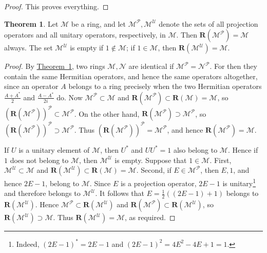 \documentclass[
  paper=b5,
  twoside=true,
  fontsize=13pt,
  headings=normal,
  bookmarkpackage=false
]{scrartcl}
\theoremstyle{definition}
\newtheorem{theorem}{Theorem}
\newcommand{\TheoremRef}[1]{\hyperref[thm:#1]{Theorem~#1}}
\newcommand{\GeneratedRing}{\boldsymbol{R}}
\begin{document}
\begin{proof}
This proves everything.
\end{proof}

\begin{theorem}\label{thm:2}
Let \(\mathcal M\) be a ring, and let
\(\mathcal M^{\mathcal P},\mathcal M^{\mathcal U}\) denote the sets of all
projection operators and all unitary operators, respectively, in
\(\mathcal M\). Then \(\GeneratedRing (\mathcal M^{\mathcal P})=\mathcal M\) always.
The set \(\mathcal M^{\mathcal U}\) is empty if \(1\notin\mathcal M\);
if \(1\in\mathcal M\), then \(\GeneratedRing (\mathcal M^{\mathcal U})=\mathcal M\).
\end{theorem}

\begin{proof}
By \TheoremRef{1}, two rings \(\mathcal M,\mathcal N\) are identical if
\(\mathcal M^{\mathcal P}=\mathcal N^{\mathcal P}\). For then they
contain the same Hermitian operators, and hence the same operators
altogether, since an operator \(A\) belongs to a ring precisely when the
two Hermitian operators \(\frac{A+A^*}{2}\) and \(\frac{A-A^*}{2i}\) do.
Now \(\mathcal M^{\mathcal P}\subset\mathcal M\) and
\(\GeneratedRing (\mathcal M^{\mathcal P})\subset \GeneratedRing (\mathcal M)=\mathcal M\), so
\((\GeneratedRing (\mathcal M^{\mathcal P}))^{\mathcal P}\subset\mathcal M^{\mathcal P}\).
On the other hand, \(\GeneratedRing (\mathcal M^{\mathcal P})\supset\mathcal M^{\mathcal P}\),
so \((\GeneratedRing (\mathcal M^{\mathcal P}))^{\mathcal P}\supset\mathcal M^{\mathcal P}\).
Thus \((\GeneratedRing (\mathcal M^{\mathcal P}))^{\mathcal P}=\mathcal M^{\mathcal P}\),
and hence \(\GeneratedRing (\mathcal M^{\mathcal P})=\mathcal M\).

If \(U\) is a unitary element of \(\mathcal M\), then \(U^*\) and
\(UU^*=1\) also belong to \(\mathcal M\). Hence if \(1\) does not belong
to \(\mathcal M\), then \(\mathcal M^{\mathcal U}\) is empty. Suppose
that \(1\in\mathcal M\). First,
\(\mathcal M^{\mathcal U}\subset\mathcal M\) and
\(\GeneratedRing (\mathcal M^{\mathcal U})\subset \GeneratedRing (\mathcal M)=\mathcal M\).
Second, if \(E\in\mathcal M^{\mathcal P}\), then \(E,1\), and hence \(2E-1\),
belong to \(\mathcal M\). Since \(E\) is a projection operator, \(2E-1\)
is unitary\footnote{\label{fn:47}Indeed, \((2E-1)^*=2E-1\) and
\((2E-1)^2=4E^2-4E+1=1\).} and therefore belongs to \(\mathcal M^{\mathcal U}\).
It follows that \(E=\tfrac12((2E-1)+1)\) belongs to \(\GeneratedRing (\mathcal M^{\mathcal U})\).
Hence \(\mathcal M^{\mathcal P}\subset \GeneratedRing (\mathcal M^{\mathcal U})\) and
\(\GeneratedRing (\mathcal M^{\mathcal P})\subset \GeneratedRing (\mathcal M^{\mathcal U})\), so
\(\GeneratedRing (\mathcal M^{\mathcal U})\supset\mathcal M\). Thus
\(\GeneratedRing (\mathcal M^{\mathcal U})=\mathcal M\), as required.
\end{proof}
\end{document}
